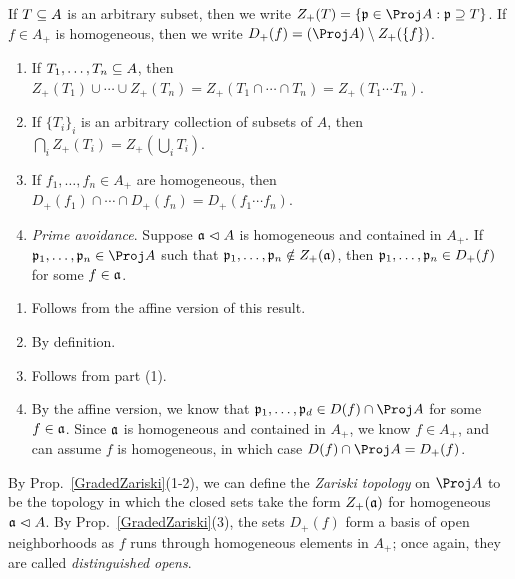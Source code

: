 \documentclass[10pt,final,oneside]{amsbook}
\makeatletter
\renewenvironment{proof}[1][\proofname] 
{ 	
	\par\pushQED{\qed}\normalfont\topsep6\p@\@plus6\p@\relax\trivlist\itemindent\normalparindent
	\item[\hskip\labelsep\itshape#1\@addpunct{.}]\ignorespaces
}
{
	\popQED\endtrivlist\@endpefalse
}
\numberwithin{equation}{section}
\makeatother
\begin{document}
If $T \subseteq A$ is an arbitrary subset, then we write $Z_+(T) = \{\fr{p} \in \Proj A : \fr{p} \supseteq T\}$.
If $f \in A_+$ is homogeneous, then we write $D_+(f) = (\Proj A) \setminus Z_+(\{f\})$.

\begin{prop}\label{GradedZariski}\mbox{}
\begin{enumerate}
\item 	If $T_1, \ldots, T_n \subseteq A$, then $Z_+(T_1) \cup \cdots \cup Z_+(T_n) = Z_+(T_1 \cap \cdots \cap T_n) = Z_+(T_1\cdots T_n)$.
\item 	If $\{T_i\}_i$ is an arbitrary collection of subsets of $A$, then $\bigcap_i Z_+(T_i) = Z_+(\bigcup_i T_i)$.
\item 	If $f_1, \ldots, f_n \in A_+$ are homogeneous, then $D_+(f_1)\cap \cdots \cap D_+(f_n) = D_+(f_1 \cdots f_n)$.
\item 	\emph{Prime avoidance}.
			Suppose $\mathfrak{a} \vartriangleleft A$ is homogeneous and contained in $A_+$.
			If $\fr{p}_1, \ldots, \fr{p}_n \in \Proj A$ such that $\mathfrak{p}_1, \ldots, \mathfrak{p}_n \notin Z_+(\mathfrak{a})$, then $\mathfrak{p}_1, \ldots, \mathfrak{p}_n \in D_+(f)$ for some $f \in \mathfrak{a}$.
\end{enumerate}
\end{prop}

\begin{proof}\mbox{}
\begin{enumerate}
\item 	Follows from the affine version of this result.
\item 	By definition.
\item 	Follows from part (1).
\item 	By the affine version, we know that $\fr{p}_1, \ldots, \fr{p}_d \in D(f) \cap \Proj A$ for some $f \in \mathfrak{a}$.
			Since $\mathfrak{a}$ is homogeneous and contained in $A_+$, we know $f \in A_+$, and can assume $f$ is homogeneous, in which case $D(f) \cap \Proj A = D_+(f)$.
			\qedhere
\end{enumerate}
\end{proof}

By Prop.~\ref{GradedZariski}(1-2), we can define the \emph{Zariski topology} on $\Proj A$ to be the topology in which the closed sets take the form $Z_+(\mathfrak{a})$ for homogeneous $\mathfrak{a} \vartriangleleft A$.
By Prop.~\ref{GradedZariski}(3), the sets $D_+(f)$ form a basis of open neighborhoods as $f$ runs through homogeneous elements in $A_+$; once again, they are called \emph{distinguished opens}.

\subsection{}
\end{document}
